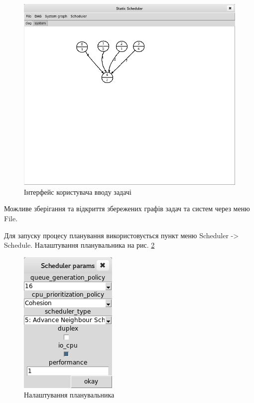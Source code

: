     \begin{figure}[h!]
      \begin{center}
        \includegraphics[width=\textwidth]{res/gui_graph_new.png}
      \end{center}
      \caption{Інтерфейс користувача вводу задачі}
    \label{fig:gui_graph_2}
    \end{figure}

Можливе зберігання та відкриття збережених графів задач та систем через меню File.

Для запуску процесу планування використовується пункт меню Scheduler -> Schedule.
Налаштування планувальника на рис. \ref{fig:sched_params}

    \begin{figure}[h!]
      \begin{center}
        \includegraphics{res/sched_params.png}
      \end{center}
      \caption{Налаштування планувальника}
    \label{fig:sched_params}
    \end{figure}
